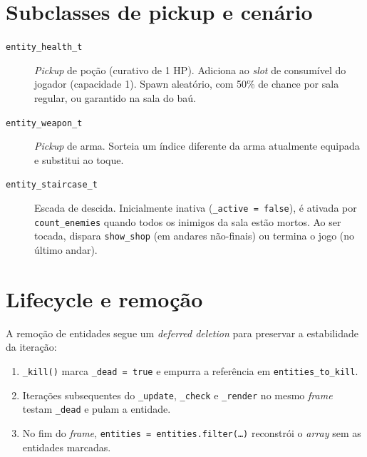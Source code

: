 \section{Subclasses de pickup e cenário}

\begin{description}
  \item[\texttt{entity\_health\_t}] \emph{Pickup} de poção (curativo de 1 HP). Adiciona
    ao \emph{slot} de consumível do jogador (capacidade 1). Spawn aleatório, com 50\%
    de chance por sala regular, ou garantido na sala do baú.
  \item[\texttt{entity\_weapon\_t}] \emph{Pickup} de arma. Sorteia um índice diferente
    da arma atualmente equipada e substitui ao toque.
  \item[\texttt{entity\_staircase\_t}] Escada de descida. Inicialmente inativa
    (\texttt{\_active = false}), é ativada por \texttt{count\_enemies} quando todos os
    inimigos da sala estão mortos. Ao ser tocada, dispara \texttt{show\_shop} (em
    andares não-finais) ou termina o jogo (no último andar).
\end{description}

\section{Lifecycle e remoção}

A remoção de entidades segue um \textit{deferred deletion} para preservar a
estabilidade da iteração:

\begin{enumerate}
  \item \texttt{\_kill()} marca \texttt{\_dead = true} e empurra a referência em
    \texttt{entities\_to\_kill}.
  \item Iterações subsequentes do \texttt{\_update}, \texttt{\_check} e
    \texttt{\_render} no mesmo \emph{frame} testam \texttt{\_dead} e pulam a entidade.
  \item No fim do \emph{frame}, \texttt{entities = entities.filter(\dots)} reconstrói
    o \emph{array} sem as entidades marcadas.
\end{enumerate}
